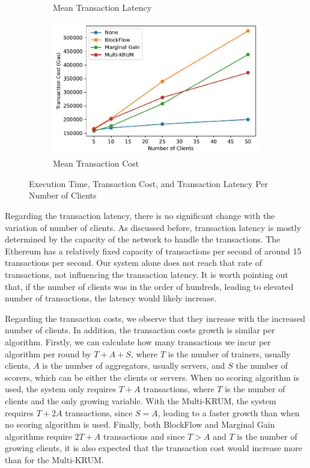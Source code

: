 \begin{figure}[!ht]
\begin{subfigure}[b]{0.49\textwidth}
        \caption{Mean Transaction Latency}
    \end{subfigure}
    \hfill
    \begin{subfigure}[b]{0.49\textwidth}
        \centering
        \includegraphics[width=\textwidth]{graphics/clients/tx_cost.pdf}
        \caption{Mean Transaction Cost}
    \end{subfigure}
    \caption{Execution Time, Transaction Cost, and Transaction Latency Per Number of Clients}
    \label{fig:clients_metrics}
\end{figure}

Regarding the transaction latency, there is no significant change with the variation of number of clients. As discussed before, transaction latency is mostly determined by the capacity of the network to handle the transactions. The Ethereum has a relatively fixed capacity of transactions per second of around 15 transactions per second. Our system alone does not reach that rate of transactions, not influencing the transaction latency. It is worth pointing out that, if the number of clients was in the order of hundreds, leading to elevated number of transactions, the latency would likely increase.

Regarding the transaction costs, we observe that they increase with the increased number of clients. In addition, the transaction costs growth is similar per algorithm. Firstly, we can calculate how many transactions we incur per algorithm per round by $T+A+S$, where $T$ is the number of trainers, usually clients, $A$ is the number of aggregators, usually servers, and $S$ the number of scorers, which can be either the clients or servers. When no scoring algorithm is used, the system only requires $T+A$ transactions, where $T$ is the number of clients and the only growing variable. With the Multi-KRUM, the system requires $T+2A$ transactions, since $S=A$, leading to a faster growth than when no scoring algorithm is used. Finally, both BlockFlow and Marginal Gain algorithms require $2T+A$ transactions and since $T > A$ and $T$ is the number of growing clients, it is also expected that the transaction cost would increase more than for the Multi-KRUM.

